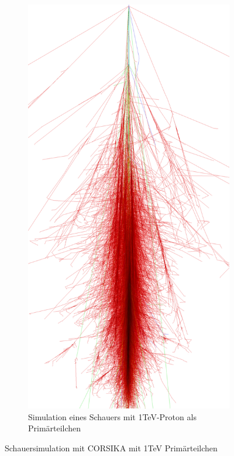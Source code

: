 \begin{figure}
\begin{subfigure}{0.4\textwidth}
 \end{subfigure}
 \hspace{2.0cm}
  \begin{subfigure}{0.4\textwidth}
  \includegraphics[width=\textwidth]{./Plots/03_MonteCarlos/Proton_1TeV_CORSIKA.png}
  \caption{Simulation eines Schauers mit 1TeV-Proton als Primärteilchen}
 \end{subfigure}
  \caption{ Schauersimulation mit CORSIKA mit 1TeV Primärteilchen}
  \label{CORSIKA_Schauer}
 \end{figure}



